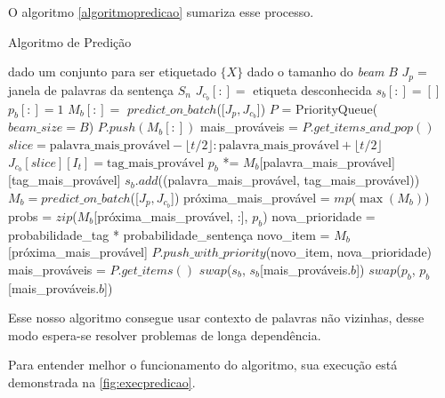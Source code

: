 O algoritmo \ref{algoritmopredicao} sumariza esse processo.

\begin{algorithm}[!htb]
\caption{Algoritmo de Predição} \label{algoritmopredicao}
\begin{algorithmic}[1]
  \State dado um conjunto para ser etiquetado $\{X\}$
  \State dado o tamanho do \textit{beam} $B$
    \State $J_p = $ janela de palavras da sentença $S_n$
    \State $J_{c_b}[:] = $ etiqueta desconhecida 
    \State $s_b[:] = []$
    \State $p_b[:] = 1$ 
    \State $M_b[:] = $ $predict\_on\_batch$([$J_p, J_{c_b}$])
    \State $P$ = PriorityQueue($beam\_size=B$)
    \State $P.push(M_b[:])$
      \State mais\_prováveis = $P.get\_items\_and\_pop()$
        \State $slice = \mbox{palavra\_mais\_provável}-\lfloor t/2 \rfloor:\mbox{palavra\_mais\_provável}+\lfloor t/2 \rfloor$
        \State $J_{c_b}[slice][I_t] = \mbox{tag\_mais\_provável}$
        \State $p_b$ *= $M_b$[palavra\_mais\_provável][tag\_mais\_provável]
        \State $s_b.add$((palavra\_mais\_provável, tag\_mais\_provável))
        \State $M_b = predict\_on\_batch$([$J_p, J_{c_b}$])
      \EndFor
      \State próxima\_mais\_provável = $mp$($\max(M_b)$)
      \State probs = $zip$($M_b$[próxima\_mais\_provável, :], $p_b$)
        \State nova\_prioridade = probabilidade\_tag * probabilidade\_sentença
        \State novo\_item = $M_b$[próxima\_mais\_provável]
        \State $P.push\_with\_priority$(novo\_item, nova\_prioridade)
      \EndFor 
      \State mais\_prováveis = $P.get\_items()$
      \State $swap$($s_b$, $s_b$[mais\_prováveis.$b$])
      \State $swap$($p_b$, $p_b$[mais\_prováveis.$b$])
    \EndWhile
  \EndFor
\EndProcedure
\end{algorithmic}
\end{algorithm}


Esse nosso algoritmo consegue usar contexto de palavras não vizinhas, desse modo espera-se resolver problemas de longa dependência.

Para entender melhor o funcionamento do algoritmo, sua execução está demonstrada na \autoref{fig:execpredicao}.

